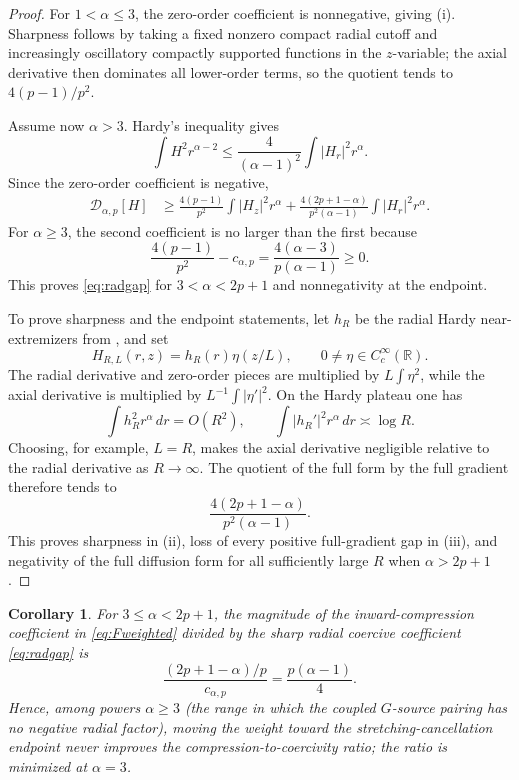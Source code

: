 \documentclass[11pt]{article}
\numberwithin{equation}{section}
\newtheorem{corollary}[theorem]{Corollary}
\theoremstyle{remark}
\newcommand{\R}{\mathbb R}
\begin{document}
\begin{proof}
For \(1<\alpha\le3\), the zero-order coefficient is nonnegative, giving (i).  Sharpness follows by taking a fixed nonzero compact radial cutoff and increasingly oscillatory compactly supported functions in the \(z\)-variable; the axial derivative then dominates all lower-order terms, so the quotient tends to \(4(p-1)/p^2\).

Assume now \(\alpha>3\).  Hardy's inequality gives
\[
 \int H^2r^{\alpha-2}\le\frac4{(\alpha-1)^2}
 \int|H_r|^2r^\alpha.
\]
Since the zero-order coefficient is negative,
\begin{align*}
 \mathcal D_{\alpha,p}[H]
 &\ge
 \frac{4(p-1)}{p^2}\int|H_z|^2r^\alpha
 +\frac{4(2p+1-\alpha)}{p^2(\alpha-1)}
  \int|H_r|^2r^\alpha.
\end{align*}
For \(\alpha\ge3\), the second coefficient is no larger than the first because
\[
 \frac{4(p-1)}{p^2}-c_{\alpha,p}
 =\frac{4(\alpha-3)}{p(\alpha-1)}\ge0.
\]
This proves \eqref{eq:radgap} for \(3<\alpha<2p+1\) and nonnegativity at the endpoint.

To prove sharpness and the endpoint statements, let \(h_R\) be the radial Hardy near-extremizers from , and set
\[
 H_{R,L}(r,z)=h_R(r)\eta(z/L),
 \qquad 0\ne\eta\in C_c^\infty(\R).
\]
The radial derivative and zero-order pieces are multiplied by \(L\int\eta^2\), while the axial derivative is multiplied by \(L^{-1}\int|\eta'|^2\).  On the Hardy plateau one has
\[
 \int h_R^2r^\alpha\,dr=O(R^2),
 \qquad
 \int |h_R'|^2r^\alpha\,dr\asymp\log R.
\]
Choosing, for example, \(L=R\), makes the axial derivative negligible relative to the radial derivative as \(R\to\infty\).  The quotient of the full form by the full gradient therefore tends to
\[
 \frac{4(2p+1-\alpha)}{p^2(\alpha-1)}.
\]
This proves sharpness in (ii), loss of every positive full-gradient gap in (iii), and negativity of the full diffusion form for all sufficiently large \(R\) when \(\alpha>2p+1\).
\end{proof}

\begin{corollary}\label{cor:ratio}
For \(3\le\alpha<2p+1\), the magnitude of the inward-compression coefficient in \eqref{eq:Fweighted} divided by the sharp radial coercive coefficient \eqref{eq:radgap} is
\begin{equation}\label{eq:ratio}
 \frac{(2p+1-\alpha)/p}{c_{\alpha,p}}
 =\frac{p(\alpha-1)}4.
\end{equation}
Hence, among powers \(\alpha\ge3\) (the range in which the coupled \(G\)-source pairing has no negative radial factor), moving the weight toward the stretching-cancellation endpoint never improves the compression-to-coercivity ratio; the ratio is minimized at \(\alpha=3\).
\end{corollary}
\end{document}
